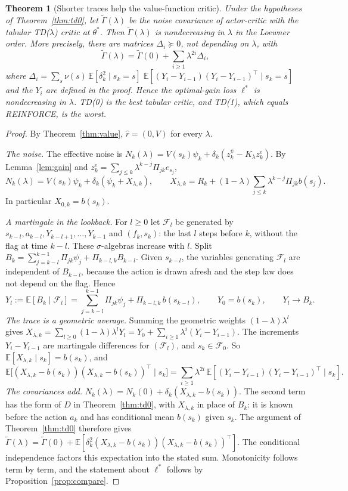 \documentclass[11pt]{article}
\newtheorem{theorem}{Theorem}[section]
\theoremstyle{definition}
\theoremstyle{remark}
\newcommand{\E}{\mathbb{E}}
\begin{document}
\begin{theorem}[Shorter traces help the value-function critic]\label{thm:mono}
Under the hypotheses of Theorem~\ref{thm:td0}, let $\tilde\Gamma(\lambda)$ be the noise covariance of
actor-critic with the tabular TD($\lambda$) critic at $\theta^*$. Then $\tilde\Gamma(\lambda)$ is nondecreasing in
$\lambda$ in the Loewner order. More precisely, there are matrices $\Delta_i \succeq 0$, not depending on
$\lambda$, with
\[
  \tilde\Gamma(\lambda) = \tilde\Gamma(0) + \sum_{i\ge1}\lambda^{2i}\Delta_i ,
\]
where
$\Delta_i = \sum_s\nu(s)\,\E[\delta_k^2\mid s_k = s]\;\E[(Y_i - Y_{i-1})(Y_i - Y_{i-1})^\top\mid s_k = s]$
and the $Y_i$ are defined in the proof. Hence the optimal-gain loss $\ell^*$ is nondecreasing in
$\lambda$. TD(0) is the best tabular critic, and TD(1), which equals REINFORCE, is the worst.
\end{theorem}
\begin{proof}
By Theorem~\ref{thm:value}, $\hat r = (0, V)$ for every $\lambda$.

\emph{The noise.} The effective noise is
$N_k(\lambda) = V(s_k)\psi_k + \delta_k(z^\psi_k - K_\lambda z^e_k)$. By Lemma~\ref{lem:gain} and
$z^e_k = \sum_{j\le k}\lambda^{k-j}\Pi_{jk}e_{s_j}$,
\[
N_k(\lambda) = V(s_k)\psi_k + \delta_k(\psi_k + X_{\lambda,k}),\qquad
X_{\lambda,k} = R_k + (1-\lambda)\sum_{j\le k}\lambda^{k-j}\Pi_{jk}b(s_j).
\]
In particular $X_{0,k} = b(s_k)$.

\emph{A martingale in the lookback.} For $l \ge 0$ let $\mathcal F_l$ be generated by
$s_{k-l}, a_{k-l}, Y_{k-l+1},\dots,Y_{k-1}$ and $(f_k, s_k)$: the last $l$ steps before $k$, without the flag
at time $k-l$. These $\sigma$-algebras increase with $l$. Split
$B_k = \sum_{j=k-l}^{k-1}\Pi_{jk}\psi_j + \Pi_{k-l,k}B_{k-l}$. Given $s_{k-l}$, the variables generating
$\mathcal F_l$ are independent of $B_{k-l}$, because the action is drawn afresh and the step law does
not depend on the flag. Hence
\[
Y_l := \E[B_k\mid\mathcal F_l] = \sum_{j=k-l}^{k-1}\Pi_{jk}\psi_j + \Pi_{k-l,k}\,b(s_{k-l}),
\qquad Y_0 = b(s_k),\qquad Y_l \to B_k .
\]
\emph{The trace is a geometric average.} Summing the geometric weights $(1-\lambda)\lambda^l$ gives
$X_{\lambda,k} = \sum_{l\ge0}(1-\lambda)\lambda^lY_l = Y_0 + \sum_{i\ge1}\lambda^i(Y_i - Y_{i-1})$. The increments
$Y_i - Y_{i-1}$ are martingale differences for $(\mathcal F_l)$, and $s_k \in \mathcal F_0$. So
$\E[X_{\lambda,k}\mid s_k] = b(s_k)$, and
\[
\E\big[(X_{\lambda,k} - b(s_k))(X_{\lambda,k} - b(s_k))^\top\mid s_k\big]
= \sum_{i\ge1}\lambda^{2i}\,\E[(Y_i - Y_{i-1})(Y_i - Y_{i-1})^\top\mid s_k].
\]
\emph{The covariances add.} $N_k(\lambda) = N_k(0) + \delta_k(X_{\lambda,k} - b(s_k))$. The second term has the
form of $D$ in Theorem~\ref{thm:td0}, with $X_{\lambda,k}$ in place of $B_k$: it is known before the action
$a_k$ and has conditional mean $b(s_k)$ given $s_k$. The argument of Theorem~\ref{thm:td0} therefore gives
$\tilde\Gamma(\lambda) = \tilde\Gamma(0) + \E[\delta_k^2(X_{\lambda,k} - b(s_k))(X_{\lambda,k} - b(s_k))^\top]$. The conditional
independence factors this expectation into the stated sum. Monotonicity follows term by term, and
the statement about $\ell^*$ follows by Proposition~\ref{prop:compare}.
\end{proof}
\end{document}
